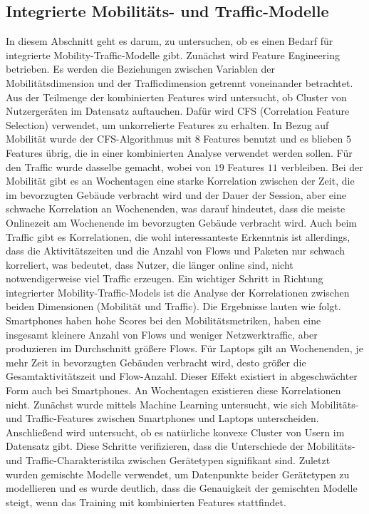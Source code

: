 \documentclass[12pt, a4paper]{article}
\begin{document}
\vfill
\pagebreak

\subsection{Integrierte Mobilitäts- und Traffic-Modelle}

In diesem Abschnitt geht es darum, zu untersuchen, ob es einen Bedarf für integrierte Mobility-Traffic-Modelle gibt.
Zunächst wird Feature Engineering betrieben. Es werden die Beziehungen zwischen Variablen der Mobilitätsdimension
und der Trafficdimension getrennt voneinander betrachtet. Aus der Teilmenge der kombinierten Features wird untersucht,
ob Cluster von Nutzergeräten im Datensatz auftauchen. Dafür wird \textsc{CFS} (Correlation Feature Selection) verwendet,
um unkorrelierte Features zu erhalten. In Bezug auf Mobilität wurde der \textsc{CFS}-Algorithmus mit $8$ Features
benutzt und es blieben $5$ Features übrig, die in einer kombinierten Analyse verwendet werden sollen.
Für den Traffic wurde dasselbe gemacht, wobei von $19$ Features $11$ verbleiben.\newline
Bei der Mobilität gibt es an Wochentagen eine starke Korrelation zwischen der Zeit, die im bevorzugten Gebäude 
verbracht wird und der Dauer der Session, aber eine schwache Korrelation an Wochenenden, was darauf hindeutet,
dass die meiste Onlinezeit am Wochenende im bevorzugten Gebäude verbracht wird.\newline
Auch beim Traffic gibt es Korrelationen, die wohl interessanteste Erkenntnis ist allerdings, dass die
Aktivitätszeiten und die Anzahl von Flows und Paketen nur schwach korreliert, was bedeutet, dass Nutzer,
die länger online sind, nicht notwendigerweise viel Traffic erzeugen.
\newline\newline
Ein wichtiger Schritt in Richtung integrierter Mobility-Traffic-Models ist die Analyse der Korrelationen
zwischen beiden Dimensionen (Mobilität und Traffic).\newline
Die Ergebnisse lauten wie folgt. Smartphones haben hohe Scores bei den Mobilitätsmetriken, haben eine
insgesamt kleinere Anzahl von Flows und weniger Netzwerktraffic, aber produzieren im Durchschnitt größere Flows.
Für Laptops gilt an Wochenenden, je mehr Zeit in bevorzugten Gebäuden verbracht wird, desto größer die Gesamtaktivitätszeit
und Flow-Anzahl. Dieser Effekt existiert in abgeschwächter Form auch bei Smartphones. 
An Wochentagen existieren diese Korrelationen nicht.
\newline\newline
Zunächst wurde mittels Machine Learning untersucht, wie sich Mobilitäts- und Traffic-Features zwischen
Smartphones und Laptops unterscheiden. Anschließend wird untersucht, ob es natürliche konvexe Cluster von Usern im
Datensatz gibt. Diese Schritte verifizieren, dass die Unterschiede der Mobilitäts- und Traffic-Charakteristika zwischen
Gerätetypen signifikant sind.
\newline\newline
Zuletzt wurden gemischte Modelle verwendet, um Datenpunkte beider Gerätetypen zu modellieren
und es wurde deutlich, dass die Genauigkeit der gemischten Modelle steigt, wenn das Training mit kombinierten Features stattfindet.
\end{document}
